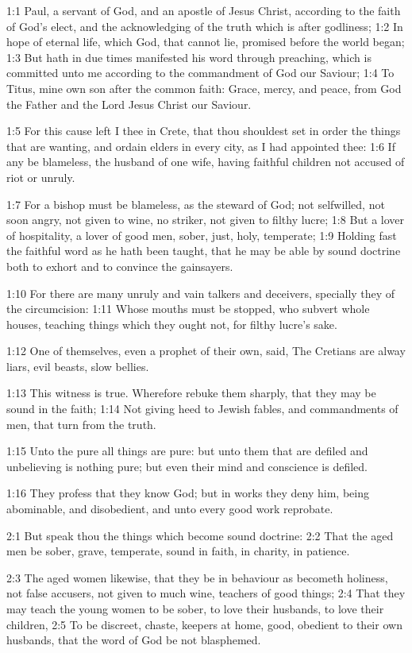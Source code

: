

1:1 Paul, a servant of God, and an apostle of Jesus Christ, according
to the faith of God's elect, and the acknowledging of the truth which
is after godliness; 1:2 In hope of eternal life, which God, that
cannot lie, promised before the world began; 1:3 But hath in due times
manifested his word through preaching, which is committed unto me
according to the commandment of God our Saviour; 1:4 To Titus, mine
own son after the common faith: Grace, mercy, and peace, from God the
Father and the Lord Jesus Christ our Saviour.

1:5 For this cause left I thee in Crete, that thou shouldest set in
order the things that are wanting, and ordain elders in every city, as
I had appointed thee: 1:6 If any be blameless, the husband of one
wife, having faithful children not accused of riot or unruly.

1:7 For a bishop must be blameless, as the steward of God; not
selfwilled, not soon angry, not given to wine, no striker, not given
to filthy lucre; 1:8 But a lover of hospitality, a lover of good men,
sober, just, holy, temperate; 1:9 Holding fast the faithful word as he
hath been taught, that he may be able by sound doctrine both to exhort
and to convince the gainsayers.

1:10 For there are many unruly and vain talkers and deceivers,
specially they of the circumcision: 1:11 Whose mouths must be stopped,
who subvert whole houses, teaching things which they ought not, for
filthy lucre's sake.

1:12 One of themselves, even a prophet of their own, said, The
Cretians are alway liars, evil beasts, slow bellies.

1:13 This witness is true. Wherefore rebuke them sharply, that they
may be sound in the faith; 1:14 Not giving heed to Jewish fables, and
commandments of men, that turn from the truth.

1:15 Unto the pure all things are pure: but unto them that are defiled
and unbelieving is nothing pure; but even their mind and conscience is
defiled.

1:16 They profess that they know God; but in works they deny him,
being abominable, and disobedient, and unto every good work reprobate.

2:1 But speak thou the things which become sound doctrine: 2:2 That
the aged men be sober, grave, temperate, sound in faith, in charity,
in patience.

2:3 The aged women likewise, that they be in behaviour as becometh
holiness, not false accusers, not given to much wine, teachers of good
things; 2:4 That they may teach the young women to be sober, to love
their husbands, to love their children, 2:5 To be discreet, chaste,
keepers at home, good, obedient to their own husbands, that the word
of God be not blasphemed.


